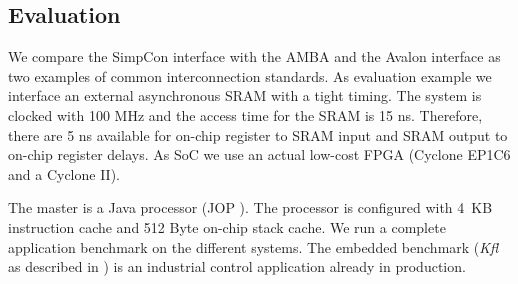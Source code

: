 \subsection{Evaluation}

We compare the SimpCon interface with the AMBA and the Avalon
interface as two examples of common interconnection standards. As
evaluation example we interface an external asynchronous SRAM with a
tight timing. The system is clocked with 100 MHz and the access time
for the SRAM is 15 ns. Therefore, there are 5 ns available for
on-chip register to SRAM input and SRAM output to on-chip register
delays. As SoC we use an actual low-cost FPGA (Cyclone EP1C6
\cite{AltCyc} and a Cyclone II).

The master is a Java processor (JOP \cite{jop:thesis,
jop:jnl:jsa2007}). The processor is configured with 4~KB instruction
cache and 512 Byte on-chip stack cache. We run a complete
application benchmark on the different systems. The embedded
benchmark (\emph{Kfl} as described in \cite{jop:austrochip05}) is an
industrial control application already in production.



